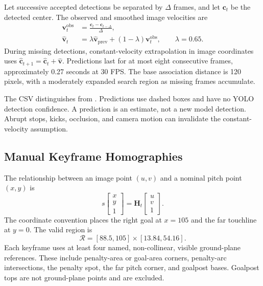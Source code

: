 \documentclass[11pt,a4paper]{article}
\newcommand{\code}[1]{\texttt{\detokenize{#1}}}
\newcommand{\ROI}{\mathcal{R}}
\begin{document}
Let successive accepted detections be separated by $\Delta$ frames, and let
$\mathbf{c}_t$ be the detected center. The observed and smoothed image velocities
are
\begin{align}
 \mathbf{v}^{\mathrm{obs}}_t
   &=\frac{\mathbf{c}_t-\mathbf{c}_{t-\Delta}}{\Delta},\\
 \widehat{\mathbf{v}}_t
   &=\lambda\widehat{\mathbf{v}}_{\mathrm{prev}}
     +(1-\lambda)\mathbf{v}^{\mathrm{obs}}_t,
 \qquad \lambda=0.65.
\end{align}
During missing detections, constant-velocity extrapolation in image coordinates
uses $\widehat{\mathbf{c}}_{t+1}
=\widehat{\mathbf{c}}_t+\widehat{\mathbf{v}}$.
Predictions last for at most eight consecutive frames, approximately
0.27 seconds at 30 FPS. The base association distance is 120 pixels, with a
moderately expanded search region as missing frames accumulate.

The CSV distinguishes \code{detected} from \code{predicted}.
Predictions use dashed boxes and have no YOLO detection confidence.
A prediction is an estimate, not a new model detection. Abrupt stops, kicks,
occlusion, and camera motion can invalidate the constant-velocity assumption.

\subsection{Manual Keyframe Homographies}

The relationship between an image point $(u,v)$ and a nominal pitch point
$(x,y)$ is
\begin{equation}
 s
 \begin{bmatrix}x\\y\\1\end{bmatrix}
 =
 \mathbf{H}_t
 \begin{bmatrix}u\\v\\1\end{bmatrix}.
\end{equation}
The coordinate convention places the right goal at $x=105$ and the far
touchline at $y=0$. The valid region is
\begin{equation}
 \ROI=[88.5,105]\times[13.84,54.16].
\end{equation}
Each keyframe uses at least four named, non-collinear, visible ground-plane
references. These include penalty-area or goal-area corners, penalty-arc
intersections, the penalty spot, the far pitch corner, and goalpost bases.
Goalpost tops are not ground-plane points and are excluded.
\end{document}
